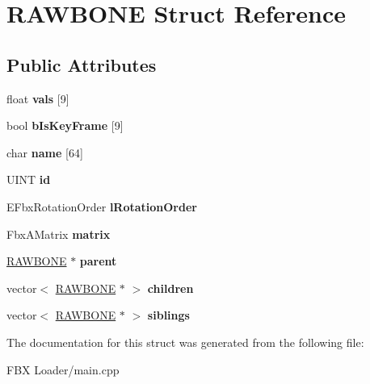 \hypertarget{struct_r_a_w_b_o_n_e}{}\section{R\+A\+W\+B\+O\+NE Struct Reference}
\label{struct_r_a_w_b_o_n_e}
\subsection*{Public Attributes}
\begin{DoxyCompactItemize}
\item 
float {\bfseries vals} \mbox{[}9\mbox{]}\hypertarget{struct_r_a_w_b_o_n_e_a144fe64308a1153fd1583c6c573f94ff}{}\label{struct_r_a_w_b_o_n_e_a144fe64308a1153fd1583c6c573f94ff}

\item 
bool {\bfseries b\+Is\+Key\+Frame} \mbox{[}9\mbox{]}\hypertarget{struct_r_a_w_b_o_n_e_a28a954a84928c317f5ced4852e863e99}{}\label{struct_r_a_w_b_o_n_e_a28a954a84928c317f5ced4852e863e99}

\item 
char {\bfseries name} \mbox{[}64\mbox{]}\hypertarget{struct_r_a_w_b_o_n_e_af340436fad67ca57b57855c6eabb0ff8}{}\label{struct_r_a_w_b_o_n_e_af340436fad67ca57b57855c6eabb0ff8}

\item 
U\+I\+NT {\bfseries id}\hypertarget{struct_r_a_w_b_o_n_e_ae6c15a28704ad7995dffc558ccc21f59}{}\label{struct_r_a_w_b_o_n_e_ae6c15a28704ad7995dffc558ccc21f59}

\item 
E\+Fbx\+Rotation\+Order {\bfseries l\+Rotation\+Order}\hypertarget{struct_r_a_w_b_o_n_e_afc7c80a2d594a01f253dd67abb39aa10}{}\label{struct_r_a_w_b_o_n_e_afc7c80a2d594a01f253dd67abb39aa10}

\item 
Fbx\+A\+Matrix {\bfseries matrix}\hypertarget{struct_r_a_w_b_o_n_e_a22480acccd8197a5c92129835e3bc9e8}{}\label{struct_r_a_w_b_o_n_e_a22480acccd8197a5c92129835e3bc9e8}

\item 
\hyperlink{struct_r_a_w_b_o_n_e}{R\+A\+W\+B\+O\+NE} $\ast$ {\bfseries parent}\hypertarget{struct_r_a_w_b_o_n_e_a83d638b01db6d148d6e0113c09feb7a1}{}\label{struct_r_a_w_b_o_n_e_a83d638b01db6d148d6e0113c09feb7a1}

\item 
vector$<$ \hyperlink{struct_r_a_w_b_o_n_e}{R\+A\+W\+B\+O\+NE} $\ast$ $>$ {\bfseries children}\hypertarget{struct_r_a_w_b_o_n_e_af6314bef0dee61bf5ed823fe98dae9ad}{}\label{struct_r_a_w_b_o_n_e_af6314bef0dee61bf5ed823fe98dae9ad}

\item 
vector$<$ \hyperlink{struct_r_a_w_b_o_n_e}{R\+A\+W\+B\+O\+NE} $\ast$ $>$ {\bfseries siblings}\hypertarget{struct_r_a_w_b_o_n_e_a412c68d88721b0a847b4dc74541ada70}{}\label{struct_r_a_w_b_o_n_e_a412c68d88721b0a847b4dc74541ada70}

\end{DoxyCompactItemize}


The documentation for this struct was generated from the following file\+:\begin{DoxyCompactItemize}
\item 
F\+B\+X Loader/main.\+cpp\end{DoxyCompactItemize}
